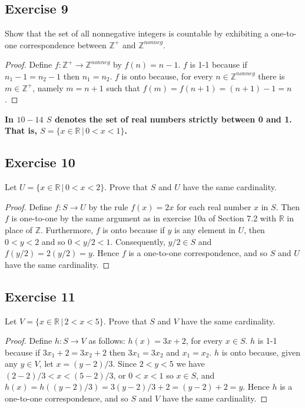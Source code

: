 \documentclass[14pt]{extarticle}
\newcommand{\R}{\mathbb{R}}
\newcommand{\Z}{\mathbb{Z}}
\newcommand{\cy}{\color{cyan}}
\begin{document}
\subsection{Exercise 9}
Show that the set of all nonnegative integers is countable by exhibiting a one-to-one correspondence between $\Z^+$ 
and \(\Z^{nonneg}\).

\begin{proof}
Define \(f: \Z^+ \to \Z^{nonneg}\) by \(f(n) = n-1\). $f$ is 1-1 because if \(n_1 - 1 = n_2 - 1\) then \(n_1 = n_2\).
$f$ is onto because, for every \(n \in \Z^{nonneg}\) there is \(m \in \Z^+\), namely \(m = n+1\) such that 
\(f(m) = f(n+1) = (n+1)-1 = n\).
\end{proof}

{\bf \cy In $10-14$ $S$ denotes the set of real numbers strictly between 0 and 1. That is, \(S = \{x \in \R \, | \, 
0 < x < 1\}\).}

\subsection{Exercise 10}
Let \(U = \{x \in \R \,|\, 0 < x < 2\}\). Prove that $S$ and $U$ have the same cardinality.

\begin{proof}
Define \(f: S \to U\) by the rule \(f(x) = 2x\) for each real number $x$ in $S$. Then $f$ is one-to-one by the same 
argument as in exercise 10a of Section 7.2 with $\R$ in place of $\Z$. Furthermore, $f$ is onto because if $y$ is 
any element in $U$, then \(0 < y < 2\) and so \(0 < y/2 < 1\). Consequently, \(y/2 \in S\) and \(f(y/2)=2(y/2) = y\). 
Hence $f$ is a one-to-one correspondence, and so $S$ and $U$ have the same cardinality.
\end{proof}

\subsection{Exercise 11}
Let \(V = \{x \in \R \,|\, 2 < x < 5\}\). Prove that $S$ and $V$ have the same cardinality.

\begin{proof}
Define \(h: S \to V\) as follows: \(h(x) = 3x + 2\), for every \(x \in S\). $h$ is 1-1 because if \(3x_1 + 2 = 3x_2 
+ 2\) then \(3x_1 = 3x_2\) and \(x_1 = x_2\). $h$ is onto because, given any \(y \in V\), let \(x = (y-2)/3\). Since
\(2 < y < 5\) we have \((2-2)/3 < x < (5-2)/3\), or \(0 < x < 1\) so \(x \in S\), and \(h(x) = h((y-2)/3) = 3(y-2)/3+2
= (y-2)+2 = y\). Hence $h$ is a one-to-one correspondence, and so $S$ and $V$ have the same cardinality.
\end{proof}
\end{document}
